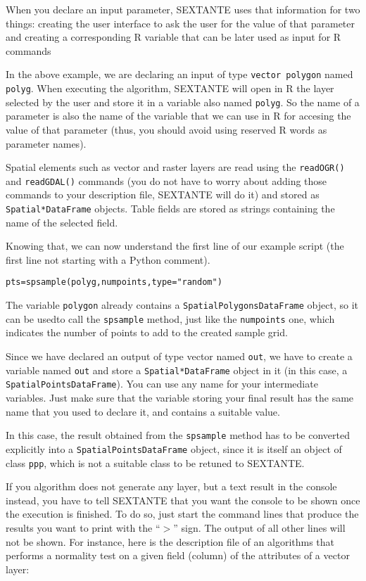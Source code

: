 When you declare an input parameter, SEXTANTE uses that information for two things: creating the user interface to ask the user for the value of that parameter and creating a corresponding R variable that can be later used as input for R commands

In the above example, we are declaring an input of type \texttt{vector polygon} named \texttt{polyg}. When executing the algorithm, SEXTANTE will open in R the layer selected by the user and store it in a variable also named \texttt{polyg}. So the name of a parameter is also the name of the variable that we can use in R for accesing the value of that parameter (thus, you should avoid using reserved R words as parameter names).

Spatial elements such as vector and raster layers are read using the \texttt{readOGR()} and \texttt{readGDAL()} commands (you do not have to worry about adding those commands to your description file, SEXTANTE will do it) and stored as \texttt{Spatial*DataFrame} objects. Table fields are stored as strings containing the name of the selected field.

Knowing that, we can now understand the first line of our example script (the first line not starting with a Python comment).


\begin{verbatim}
pts=spsample(polyg,numpoints,type="random")
\end{verbatim}

The variable \texttt{polygon} already contains a \texttt{SpatialPolygonsDataFrame} object, so it can be usedto call the \texttt{spsample} method, just like the \texttt{numpoints} one, which indicates the number of points to add to the created sample grid.

Since we have declared an output of type vector named \texttt{out}, we have to create a variable named \texttt{out} and store a \texttt{Spatial*DataFrame} object in it (in this case, a \texttt{SpatialPointsDataFrame}). You can use any name for your intermediate variables. Just make sure that the variable storing your final result has the same name that you used to declare it, and contains a suitable value.

In this case, the result obtained from the \texttt{spsample} method has to be converted explicitly into a \texttt{SpatialPointsDataFrame} object, since it is itself an object of class \texttt{ppp}, which is not a suitable class to be retuned to SEXTANTE.

If you algorithm does not generate any layer, but a text result in the console instead, you have to tell SEXTANTE that you want the console to be shown once the execution is finished. To do so, just start the command lines that produce the results you want to print with the ``$>$'' sign. The output of all other lines will not be shown. For instance, here is the description file of an algorithms that performs a normality test on a given field (column) of the attributes of a vector layer:

